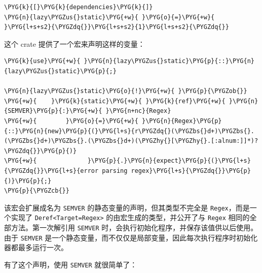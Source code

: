 \begin{Verbatim}[commandchars=\\\{\},breaklines=true,breakanywhere=true,fontsize=\codefont,xleftmargin=17bp]
\PYG{k}{[}\PYG{k}{dependencies}\PYG{k}{]}
\PYG{n}{lazy\PYGZus{}static}\PYG{+w}{ }\PYG{o}{=}\PYG{+w}{ }\PYG{l+s+s2}{\PYGZdq{}}\PYG{l+s+s2}{1}\PYG{l+s+s2}{\PYGZdq{}}
\end{Verbatim}

这个 crate 提供了一个宏来声明这样的变量：

\begin{Verbatim}[commandchars=\\\{\},breaklines=true,breakanywhere=true,fontsize=\codefont,xleftmargin=17bp]
\PYG{k}{use}\PYG{+w}{ }\PYG{n}{lazy\PYGZus{}static}\PYG{p}{::}\PYG{n}{lazy\PYGZus{}static}\PYG{p}{;}

\PYG{n}{lazy\PYGZus{}static}\PYG{o}{!}\PYG{+w}{ }\PYG{p}{\PYGZob{}}
\PYG{+w}{    }\PYG{k}{static}\PYG{+w}{ }\PYG{k}{ref}\PYG{+w}{ }\PYG{n}{SEMVER}\PYG{p}{:}\PYG{+w}{ }\PYG{n+nc}{Regex}
\PYG{+w}{        }\PYG{o}{=}\PYG{+w}{ }\PYG{n}{Regex}\PYG{p}{::}\PYG{n}{new}\PYG{p}{(}\PYG{l+s}{r\PYGZdq{}(\PYGZbs{}d+)\PYGZbs{}.(\PYGZbs{}d+)\PYGZbs{}.(\PYGZbs{}d+)(\PYGZhy{}[\PYGZhy{}.[:alnum:]]*)?\PYGZdq{}}\PYG{p}{)}
\PYG{+w}{              }\PYG{p}{.}\PYG{n}{expect}\PYG{p}{(}\PYG{l+s}{\PYGZdq{}}\PYG{l+s}{error parsing regex}\PYG{l+s}{\PYGZdq{}}\PYG{p}{)}\PYG{p}{;}
\PYG{p}{\PYGZcb{}}
\end{Verbatim}

该宏会扩展成名为 \texttt{SEMVER} 的静态变量的声明，但其类型不完全是 \texttt{Regex}，而是一个实现了 \texttt{Deref<Target=Regex>} 的由宏生成的类型，并公开了与 \texttt{Regex} 相同的全部方法。第一次解引用 \texttt{SEMVER} 时，会执行初始化程序，并保存该值供以后使用。由于 \texttt{SEMVER} 是一个静态变量，而不仅仅是局部变量，因此每次执行程序时初始化器都最多运行一次。

有了这个声明，使用 \texttt{SEMVER} 就很简单了：

